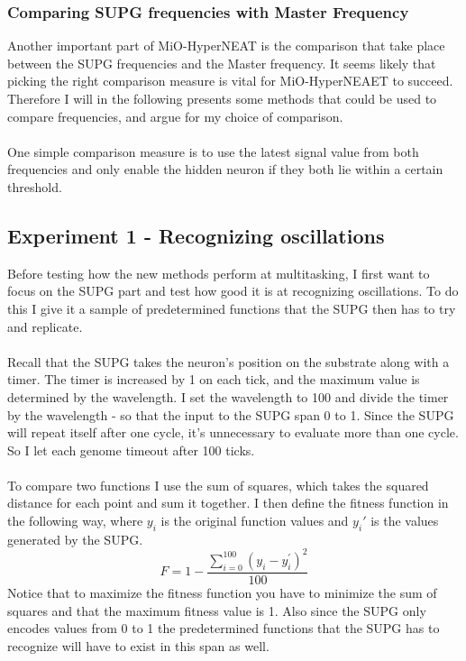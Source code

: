 \documentclass[11pt, a4paper]{article}
\begin{document}
\subsubsection{Comparing SUPG frequencies with Master Frequency}
Another important part of MiO-HyperNEAT is the comparison that take place between the SUPG frequencies and the Master frequency. It seems likely that picking the right comparison measure is vital for MiO-HyperNEAET to succeed. Therefore I will in the following presents some methods that could be used to compare frequencies, and argue for my choice of comparison.
\\
\\
One simple comparison measure is to use the latest signal value from both frequencies and only enable the hidden neuron if they both lie within a certain threshold.
\subsection{Experiment 1 - Recognizing oscillations}
Before testing how the new methods perform at  multitasking, I first want to focus on the SUPG part and test how good it is at recognizing oscillations. To do this I give it a sample of predetermined functions that the SUPG then has to try and replicate.
\\
\\
Recall that the SUPG takes the neuron's position on the substrate along with a timer. The timer is increased by 1 on each tick, and the maximum value is determined by the wavelength. I set the wavelength to 100 and divide the timer by the wavelength - so that the input to the SUPG span 0 to 1. Since the SUPG will repeat itself after one cycle, it's unnecessary to evaluate more than one cycle. So I let each genome timeout after 100 ticks.
\\
\\
To compare two functions I use the sum of squares, which takes the squared distance for each point and sum it together. I then define the fitness function in the following way, where $ y_i $ is the original function values and $ y_i' $ is the values generated by the SUPG.
\begin{equation} F = 1 - \dfrac{\sum_{i=0}^{100}(y_i-y_i^{'})^2}{100} \end{equation}
Notice that to maximize the fitness function you have to minimize the sum of squares and that the maximum fitness value is 1. Also since the SUPG only encodes values from 0 to 1 the predetermined functions that the SUPG has to recognize will have to exist in this span as well.
\end{document}
